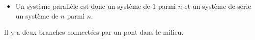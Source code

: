 \documentclass[10pt, french]{article}
\begin{document}
\begin{multicols*}{2}
\begin{definitionNOHFILL}
\begin{itemize}
	\item	Un système parallèle est donc un système de $1$ parmi $n$ et un système de série un système de $n$ parmi $n$.
\end{itemize}
\end{definitionNOHFILL}

\begin{definitionNOHFILL}
Il y a deux branches connectées par un pont dans le milieu.
\begin{center}
\begin{tikzpicture}[x=0.75pt,y=0.75pt,yscale=-1,xscale=1]


\end{tikzpicture}
\end{center}
\end{definitionNOHFILL}
\end{multicols*}
\end{document}
